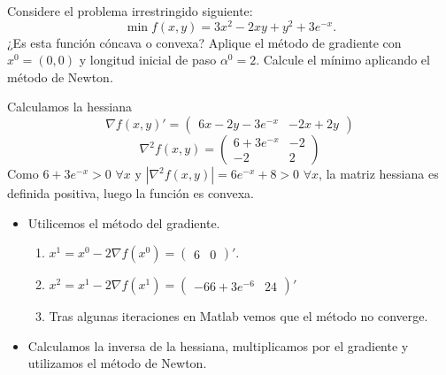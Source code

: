\documentclass[twoside]{article}
\begin{document}
\newpage
\begin{ejercicio}{5}
Considere el problema irrestringido siguiente:
$$\min f(x,y)=3x^2-2xy+y^2+3e^{-x}.$$
¿Es esta función cóncava o convexa? Aplique el método de gradiente con $x^0=(0,0)$ y longitud inicial de paso $\alpha^0=2$. Calcule el mínimo aplicando el método de Newton. 
\end{ejercicio}
\begin{solucion}
Calculamos la hessiana
$$
\nabla f(x,y)' = \begin{pmatrix}
6x-2y -3e^{-x} & -2x+2y
\end{pmatrix} 
$$
$$
\nabla^2 f(x,y) = \begin{pmatrix}
6 +3e^{-x} & -2\\
-2 & 2
\end{pmatrix} 
$$
Como $6+3e^{-x}>0$ $\forall x$ y $|\nabla^2f(x,y)|=6e^{-x}+8>0$ $\forall x$, la matriz hessiana es definida positiva, luego la función es convexa.
\begin{itemize}
\item Utilicemos el método del gradiente.
\begin{enumerate}
\item $x^1 = x^0 - 2\nabla f(x^0) = \begin{pmatrix}
6 & 0
\end{pmatrix}' $.
\item $x^2=x^1-2\nabla f(x^1) =  
\begin{pmatrix}
-66 +3e^{-6} & 24
\end{pmatrix}' $
\item Tras algunas iteraciones en Matlab vemos que el método no converge.
\end{enumerate}
\item Calculamos la inversa de la hessiana, multiplicamos por el gradiente y utilizamos el método de Newton.
\end{itemize}
\end{solucion}
\end{document}

